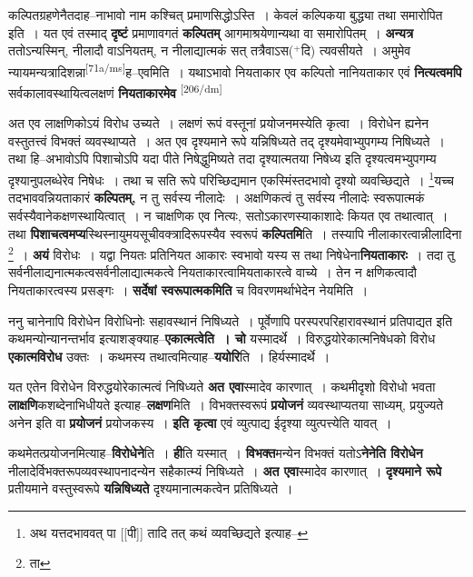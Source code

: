 \documentclass[article,12pt,a4paper]{memoir}
\newcommand{\add}[1]{($^{+}$#1)}
\begin{document}
	  \pstart कल्पितग्रहणेनैतदाह--नाभावो नाम कश्चित् प्रमाणसिद्धोऽस्ति । केवलं कल्पिकया बुद्ध्या तथा समारोपित इति । यत एवं तस्माद् \textbf{दृष्टं} प्रमाणावगतं \textbf{कल्पितम्} आगमाश्रयेणान्यथा वा समारोपितम् । \textbf{अन्यत्र} ततोऽन्यस्मिन्, नीलादौ वाऽनियतम्, न नीलाद्यात्मकं सत् तत्रैवाऽस\add{दि} त्यवसीयते । अमुमेव न्यायमन्यत्रादिशन्ना\leavevmode\textsuperscript{\rmlatinfont\tiny [71a/ms]}ह--एवमिति । यथाऽभावो नियताकार एव कल्पितो नानियताकार एवं \textbf{नित्यत्वमपि} सर्वकालावस्थायित्वलक्षणं \textbf{नियताकारमेव}  \leavevmode\textsuperscript{\rmlatinfont\tiny [206/dm]} 
	  
	अत एव लाक्षणिकोऽयं विरोध उच्यते । लक्षणं रूपं वस्तूनां प्रयोजनमस्येति कृत्वा । विरोधेन ह्यनेन वस्तुतत्त्वं विभक्तं व्यवस्थाप्यते । अत एव दृश्यमाने रूपे यन्निषिध्यते तद् दृश्यमेवाभ्युपगम्य निषिध्यते । तथा हि--अभावोऽपि पिशाचोऽपि यदा पीते निषेद्धुमिष्यते तदा दृश्यात्मतया निषेध्य इति दृश्यत्वमभ्युपगम्य दृश्यानुपलब्धेरेव निषेधः । तथा च सति रूपे परिच्छिद्यमान एकस्मिंस्तदभावो दृश्यो व्यवच्छिद्यते । \footnote{अथ यत्तदभाववत् पा [[पी]] तादि तत् कथं व्यवच्छिद्यते इत्याह--\cite{dp-msD-n}}यच्च तदभाववन्नियताकारं \textbf{कल्पितम्,} न तु सर्वस्य नीलादेः । अक्षणिकत्वं तु सर्वस्य नीलादेः स्वरूपात्मकं सर्वस्यैवानेकक्षणस्थायित्वात् । न चाक्षणिक एव नित्यः, सतोऽकारणस्याकाशादेः कियत एव तथात्वात् । तथा \textbf{पिशाचत्वमप्य}स्थिस्नायुमयसूचीवक्त्रादिरूपस्यैव स्वरूपं \textbf{कल्पितमि}ति । तस्यापि नीलाकारत्वान्नीलादिना \footnote{ता} । \textbf{अयं} विरोधः । यद्वा नियतः प्रतिनियत आकारः स्वभावो यस्य स तथा निषेधेना\textbf{नियताकारः} । तदा तु सर्वनीलाद्यनात्मकत्वसर्वनीलाद्यात्मकत्वे नियताकारत्वामियताकारत्वे वाच्ये । तेन न क्षणिकत्वादौ नियताकारत्वस्य प्रसङ्गः । \textbf{सर्देषां स्वरूपात्मकमिति} च विवरणमर्थाभेदेन नेयमिति ।
	\pend
      

	  \pstart ननु चानेनापि विरोधेन विरोधिनोः सहावस्थानं निषिध्यते । पूर्वेणापि परस्परपरिहारावस्थानं प्रतिपाद्यत इति कथमन्योन्यानन्तर्भाव इत्याशङ्क्याह--\textbf{एकात्मत्वेति । चो} यस्मादर्थे । विरुद्धयोरेकात्मनिषेधको विरोध \textbf{एकात्मविरोध} उक्तः । कथमस्य तथात्वमित्याह--\textbf{ययोरि}ति । हिर्यस्मादर्थे ।
	\pend
      

	  \pstart यत एतेन विरोधेन विरुद्धयोरेकात्मत्वं निषिध्यते \textbf{अत एवा}स्मादेव कारणात् । कथमीदृशो विरोधो भवता \textbf{लाक्षणि}कशब्देनाभिधीयते इत्याह--\textbf{लक्षण}मिति । विभक्तस्वरूपं \textbf{प्रयोजनं} व्यवस्थाप्यतया साध्यम्, प्रयुज्यते अनेन इति वा \textbf{प्रयोजनं} प्रयोजकस्य । \textbf{इति कृत्वा} एवं व्युत्पाद्य ईदृश्या व्युत्पत्त्येति यावत् ।
	\pend
      

	  \pstart कथमेतत्प्रयोजनमित्याह--\textbf{विरोधेने}ति । \textbf{ही}ति यस्मात् । \textbf{विभक्त}मन्येन विभक्तं यतोऽ\textbf{नेनेति विरोधेन} नीलादेर्विभक्तरूपव्यवस्थापनादन्येन सहैकात्म्यं निषिध्यते । \textbf{अत एवा}स्मादेव कारणात् । \textbf{दृश्यमाने रूपे} प्रतीयमाने वस्तुस्वरूपे \textbf{यन्निषिध्यते} दृश्यमानात्मकत्वेन प्रतिषिध्यते ।
	\pend
      
\end{document}
